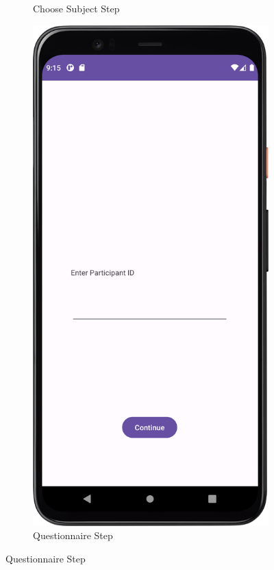 \begin{figure}[htbp]
\begin{subfigure}[b]{0.25\textwidth}
        \caption{Choose Subject Step}
        \label{subfig:chooseTestSubject2}
    \end{subfigure}
    \hspace{1cm}
    \begin{subfigure}[b]{0.25\textwidth}
        \centering
        \includegraphics[width=\textwidth]{content/06_demonstration_of_the_artifact/Screenshot_ParticipantSelectionScreen.png}
        \caption{Questionnaire Step}
        \label{subfig:Questionair2}
    \end{subfigure}


\end{figure}
